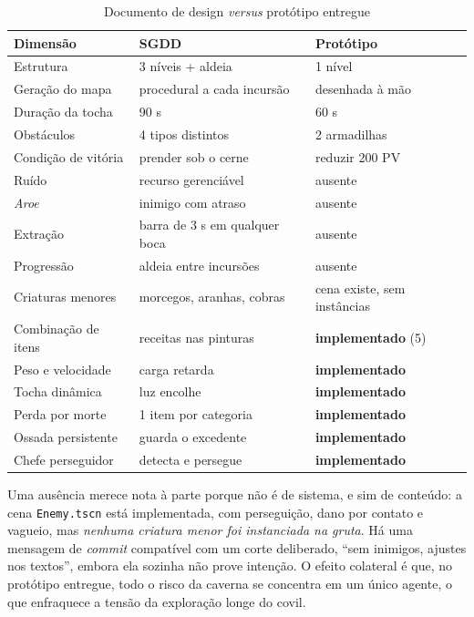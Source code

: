 \documentclass[conference]{IEEEtran}
\begin{document}
\begin{table}[t]
\caption{Documento de design \textit{versus} protótipo entregue}
\label{tab:gap}
\centering
\footnotesize
\begin{tabular}{p{2.35cm}p{2.5cm}p{2.5cm}}
\toprule
\textbf{Dimensão} & \textbf{SGDD} & \textbf{Protótipo} \\
\midrule
Estrutura & 3 níveis + aldeia & 1 nível \\
Geração do mapa & procedural a cada incursão & desenhada à mão \\
Duração da tocha & 90 s & 60 s \\
Obstáculos & 4 tipos distintos & 2 armadilhas \\
Condição de vitória & prender sob o cerne & reduzir 200 PV \\
Ruído & recurso gerenciável & ausente \\
\textit{Aroe} & inimigo com atraso & ausente \\
Extração & barra de 3 s em qualquer boca & ausente \\
Progressão & aldeia entre incursões & ausente \\
Criaturas menores & morcegos, aranhas, cobras & cena existe, sem instâncias \\
\midrule
Combinação de itens & receitas nas pinturas & \textbf{implementado} (5) \\
Peso e velocidade & carga retarda & \textbf{implementado} \\
Tocha dinâmica & luz encolhe & \textbf{implementado} \\
Perda por morte & 1 item por categoria & \textbf{implementado} \\
Ossada persistente & guarda o excedente & \textbf{implementado} \\
Chefe perseguidor & detecta e persegue & \textbf{implementado} \\
\bottomrule
\end{tabular}
\end{table}

Uma ausência merece nota à parte porque não é de sistema, e sim de conteúdo: a cena
\texttt{Enemy.tscn} está implementada, com perseguição, dano por contato e vagueio, mas
\emph{nenhuma criatura menor foi instanciada na gruta}. Há uma mensagem de \textit{commit} compatível com um corte deliberado, ``sem inimigos, ajustes nos textos'', embora ela sozinha não prove intenção. O efeito colateral é que, no protótipo entregue,
todo o risco da caverna se concentra em um único agente, o que enfraquece a tensão da
exploração longe do covil.
\end{document}
